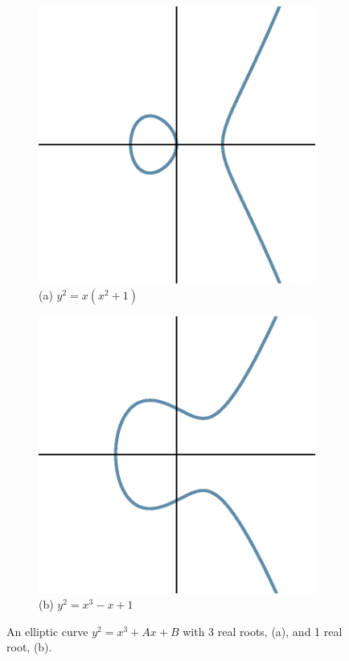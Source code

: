 	\begin{figure}[!ht]
	\centering
	\begin{subfigure}{0.35\textwidth}
	\includegraphics[width=\textwidth]{images/ec2.eps}
	\caption*{(a) $y^2=x(x^2+1)$}
	\end{subfigure}
	\begin{subfigure}{0.35\textwidth}
	\includegraphics[width=\textwidth]{images/ec1.eps}
	\caption*{(b) $y^2=x^3-x+1$}
	\end{subfigure}
	\caption{An elliptic curve $y^2= x^3 + Ax + B$ with 3 real roots, (a), and 1 real root, (b).\label{fig:ellipticex}}
	\end{figure}



